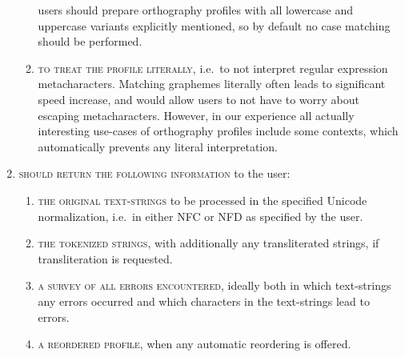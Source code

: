 \begin{enumerate}
\begin{enumerate}
        users should prepare orthography profiles with all lowercase and
        uppercase variants explicitly mentioned, so by default no case matching
        should be performed. 
		\item \textsc{to treat the profile literally}, i.e.~to not interpret regular
        expression metacharacters. Matching graphemes literally often leads to
        significant speed increase, and would allow users to not have to worry
        about escaping metacharacters. However, in our experience all actually
        interesting use-cases of orthography profiles include some contexts,
        which automatically prevents any literal interpretation.
    \end{enumerate}
	\item \textsc{should return the following information} to the user:
	\begin{enumerate}
		\def\labelenumii{C\arabic{enumii}.} \setcounter{enumii}{8} 
		\item \textsc{the original text-strings} to be processed in the specified
        Unicode normalization, i.e.~in either NFC or NFD as specified by the
        user. 
		\item \textsc{the tokenized strings}, with additionally any transliterated
        strings, if transliteration is requested. 
		\item \textsc{a survey of all errors encountered}, ideally both in which
        text-strings any errors occurred and which characters in the
        text-strings lead to errors. 
		\item \textsc{a reordered profile}, when any automatic reordering is offered. 
	\end{enumerate}
\end{enumerate}

